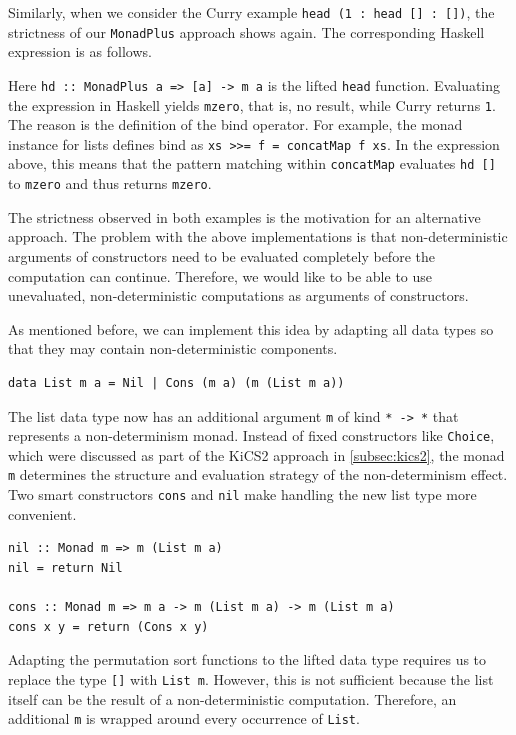 \documentclass[a4paper, 11pt, fleqn, twoside, abstract=on]{scrreprt}
\newcommand{\hinl}[1]{\texttt{#1}}
\begin{document}
Similarly, when we consider the Curry example \hinl{head (1 : head [] : [])}, the strictness of our \hinl{MonadPlus} approach shows again.
The corresponding Haskell expression is as follows.


Here \hinl{hd :: MonadPlus a => [a] -> m a} is the lifted \hinl{head} function.
Evaluating the expression in Haskell yields \hinl{mzero}, that is, no result, while Curry returns \hinl{1}.
The reason is the definition of the bind operator.
For example, the monad instance for lists defines bind as \hinl{xs >>= f = concatMap f xs}.
In the expression above, this means that the pattern matching within \hinl{concatMap} evaluates \hinl{hd []} to \hinl{mzero} and thus returns \hinl{mzero}.

The strictness observed in both examples is the motivation for an alternative approach.
The problem with the above implementations is that non-deterministic arguments of constructors need to be evaluated completely before the computation can continue.
Therefore, we would like to be able to use unevaluated, non-deterministic computations as arguments of constructors.

As mentioned before, we can implement this idea by adapting all data types so that they may contain non-deterministic components.

\begin{verbatim}
data List m a = Nil | Cons (m a) (m (List m a))
\end{verbatim}

The list data type now has an additional argument \hinl{m} of kind \hinl{* -> *} that represents a non-determinism monad.
Instead of fixed constructors like \hinl{Choice}, which were discussed as part of the KiCS2 approach in \autoref{subsec:kics2}, the monad \hinl{m} determines the structure and evaluation strategy of the non-determinism effect.
Two smart constructors \hinl{cons} and \hinl{nil} make handling the new list type more convenient.

\begin{verbatim}
nil :: Monad m => m (List m a)
nil = return Nil

cons :: Monad m => m a -> m (List m a) -> m (List m a)
cons x y = return (Cons x y)
\end{verbatim}

Adapting the permutation sort functions to the lifted data type requires us to replace the type \hinl{[]} with \hinl{List m}.
However, this is not sufficient because the list itself can be the result of a non-deterministic computation.
Therefore, an additional \hinl{m} is wrapped around every occurrence of \hinl{List}.
\end{document}
